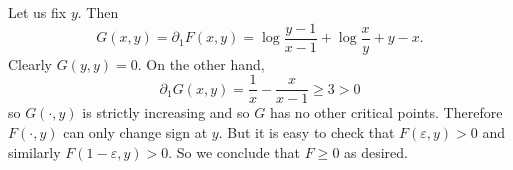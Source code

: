 \documentclass[10pt]{article}
\theoremstyle{definition}
\begin{document}
Let us fix $y$. Then
$$G(x, y) = \partial_1 F(x, y) = \log\frac{y - 1}{x - 1} + \log \frac{x}{y} + y - x.$$
Clearly $G(y, y) = 0$. On the other hand,
$$\partial_1 G(x, y) = \frac{1}{x} - \frac{x}{x - 1} \geq 3 > 0$$
so $G(\cdot, y)$ is strictly increasing and so $G$ has no other critical points.
Therefore $F(\cdot, y)$ can only change sign at $y$. But it is easy to check that $F(\varepsilon, y) > 0$ and similarly $F(1 - \varepsilon, y) > 0$.
So we conclude that $F \geq 0$ as desired.
\end{document}

